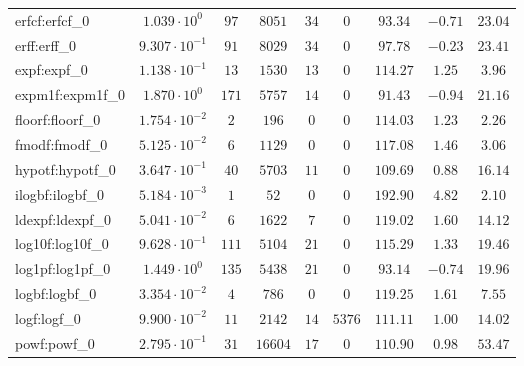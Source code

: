 \begin{tabular}{|l|c|c|c|c|c|c|c|c|}
erfcf:erfcf\_0               & $ 1.039 \cdot 10^{0}  $ & $ 97     $ & $ 8051   $ & $ 34  $ & $ 0    $ & $ 93.34       $ & $ -0.71   $ & $ 23.04   $ \\
erff:erff\_0                 & $ 9.307 \cdot 10^{-1} $ & $ 91     $ & $ 8029   $ & $ 34  $ & $ 0    $ & $ 97.78       $ & $ -0.23   $ & $ 23.41   $ \\
expf:expf\_0                 & $ 1.138 \cdot 10^{-1} $ & $ 13     $ & $ 1530   $ & $ 13  $ & $ 0    $ & $ 114.27      $ & $ 1.25    $ & $ 3.96    $ \\
expm1f:expm1f\_0             & $ 1.870 \cdot 10^{0}  $ & $ 171    $ & $ 5757   $ & $ 14  $ & $ 0    $ & $ 91.43       $ & $ -0.94   $ & $ 21.16   $ \\
floorf:floorf\_0             & $ 1.754 \cdot 10^{-2} $ & $ 2      $ & $ 196    $ & $ 0   $ & $ 0    $ & $ 114.03      $ & $ 1.23    $ & $ 2.26    $ \\
fmodf:fmodf\_0               & $ 5.125 \cdot 10^{-2} $ & $ 6      $ & $ 1129   $ & $ 0   $ & $ 0    $ & $ 117.08      $ & $ 1.46    $ & $ 3.06    $ \\
hypotf:hypotf\_0             & $ 3.647 \cdot 10^{-1} $ & $ 40     $ & $ 5703   $ & $ 11  $ & $ 0    $ & $ 109.69      $ & $ 0.88    $ & $ 16.14   $ \\
ilogbf:ilogbf\_0             & $ 5.184 \cdot 10^{-3} $ & $ 1      $ & $ 52     $ & $ 0   $ & $ 0    $ & $ 192.90      $ & $ 4.82    $ & $ 2.10    $ \\
ldexpf:ldexpf\_0             & $ 5.041 \cdot 10^{-2} $ & $ 6      $ & $ 1622   $ & $ 7   $ & $ 0    $ & $ 119.02      $ & $ 1.60    $ & $ 14.12   $ \\
log10f:log10f\_0             & $ 9.628 \cdot 10^{-1} $ & $ 111    $ & $ 5104   $ & $ 21  $ & $ 0    $ & $ 115.29      $ & $ 1.33    $ & $ 19.46   $ \\
log1pf:log1pf\_0             & $ 1.449 \cdot 10^{0}  $ & $ 135    $ & $ 5438   $ & $ 21  $ & $ 0    $ & $ 93.14       $ & $ -0.74   $ & $ 19.96   $ \\
logbf:logbf\_0               & $ 3.354 \cdot 10^{-2} $ & $ 4      $ & $ 786    $ & $ 0   $ & $ 0    $ & $ 119.25      $ & $ 1.61    $ & $ 7.55    $ \\
logf:logf\_0                 & $ 9.900 \cdot 10^{-2} $ & $ 11     $ & $ 2142   $ & $ 14  $ & $ 5376 $ & $ 111.11      $ & $ 1.00    $ & $ 14.02   $ \\
powf:powf\_0                 & $ 2.795 \cdot 10^{-1} $ & $ 31     $ & $ 16604  $ & $ 17  $ & $ 0    $ & $ 110.90      $ & $ 0.98    $ & $ 53.47   $ \\

\end{tabular}
